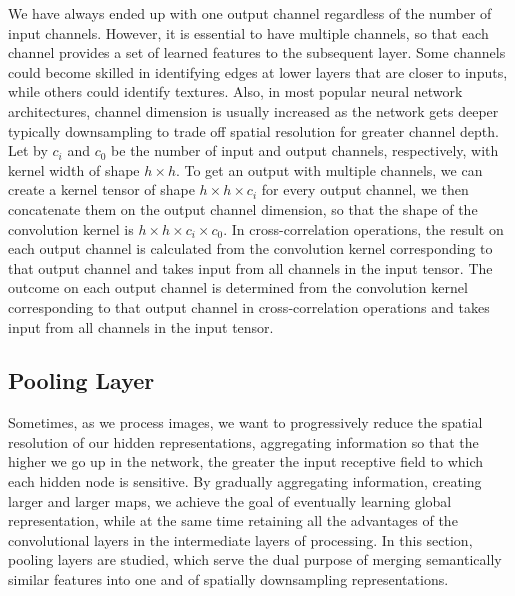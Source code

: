 \documentclass[12pt]{report}
\numberwithin{equation}{section}
\begin{document}
We have always ended up with one output channel regardless of the number of input channels. However, it is essential to have multiple channels, so that each channel provides a set of learned features to the subsequent layer. Some channels could become skilled in identifying edges at lower layers that are closer to inputs, while others could identify textures. Also, in most popular neural network architectures, channel dimension is usually increased as the network gets deeper typically downsampling to trade off spatial resolution for greater channel depth. Let by $c_i$ and $c_0$ be the number of input and output channels, respectively, with kernel width of shape $h \times h$. To get an output with multiple channels, we can create a kernel tensor of shape $h \times h \times c_i$ for every output channel, we then concatenate them on the output channel dimension, so that the shape of the convolution kernel is $h \times h \times c_i \times c_0$. In cross-correlation operations, the result on each output channel is calculated from the convolution kernel corresponding to that output channel and takes input from all channels in the input tensor. The outcome on each output channel is determined from the convolution kernel corresponding to that output channel in cross-correlation operations and takes input from all channels in the input tensor.


\subsection{Pooling Layer}
Sometimes, as we process images, we want to progressively reduce the spatial resolution of our hidden representations, aggregating information so that the higher we go up in the network, the greater the input receptive field to which each hidden node is sensitive. By gradually aggregating information, creating larger and larger maps, we achieve the goal of eventually learning global representation, while at the same time retaining all the advantages of the convolutional layers in the intermediate layers of processing. In this section, pooling layers are studied, which serve the dual purpose of merging semantically similar features into one and of spatially downsampling representations.
\end{document}

